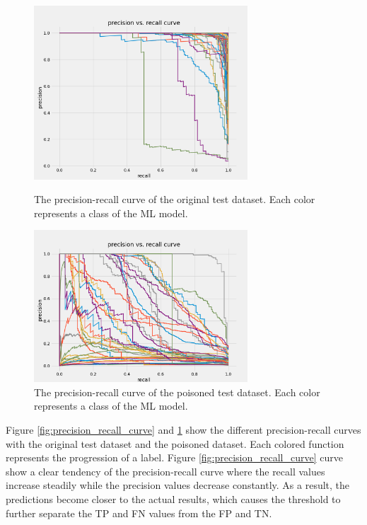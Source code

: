 \begin{figure}[!tbp]
  \centering
  \begin{minipage}[b]{0.4\textwidth}
    \includegraphics[width=8cm]{pictures/precision_recall_curve.png}
    \caption{The precision-recall curve of the original test dataset. Each color represents a class of the ML model.}
    \label{fig:precision_recall_curve}
  \end{minipage}
  \hfill
  \begin{minipage}[b]{0.4\textwidth}
    \includegraphics[width=8cm]{pictures/poisoned_precision_recall.png}
    \caption{The precision-recall curve of the poisoned test dataset. Each color represents a class of the ML model.}
    \label{fig:poisoned_precision_recall}
  \end{minipage}
\end{figure}

Figure \ref{fig:precision_recall_curve} and \ref{fig:poisoned_precision_recall} show the different precision-recall curves with the original test dataset and the poisoned dataset. Each colored function represents the progression of a label. Figure \ref{fig:precision_recall_curve} curve show a clear tendency of the precision-recall curve where the recall values increase steadily while the precision values decrease constantly. As a result, the predictions become closer to the actual results, which causes the threshold to further separate the TP and FN values from the FP and TN.

